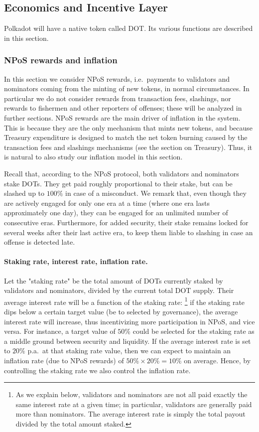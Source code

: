 \subsection{Economics and Incentive Layer}\label{sec:economics}

Polkadot will have a native token called DOT. Its various functions are described in this section.



\subsubsection{NPoS rewards and inflation}

In this section we consider NPoS rewards, i.e.~payments to validators and nominators coming from the minting of new tokens, 
in normal circumstances. In particular we do not consider rewards from transaction fees, slashings, nor rewards to fishermen 
and other reporters of offenses; these will be analyzed in further sections. 
NPoS rewards are the main driver of inflation in the system. 
This is because they are the only mechanism that mints new tokens, and because Treasury expenditure is designed to match 
the net token burning caused by the transaction fees and slashings mechanisms (see the section on Treasury). 
Thus, it is natural to also study our inflation model in this section.

Recall that, according to the NPoS protocol, both validators and nominators stake DOTs. 
They get paid roughly proportional to their stake, but can be slashed up to $100\%$ in case of a misconduct. 
We remark that, even though they are actively engaged for only one era at a time (where one era lasts approximately one day), 
they can be engaged for an unlimited number of consecutive eras. 
Furthermore, for added security, their stake remains locked for several weeks after their last active era, 
to keep them liable to slashing in case an offense is detected late.

\paragraph{Staking rate, interest rate, inflation rate.} Let the "staking rate" be the total amount of DOTs 
currently staked by validators and nominators, divided by the current total DOT supply. 
Their average interest rate will be a function of the staking rate:%
\footnote{As we explain below, validators and nominators are not all paid exactly the same 
interest rate at a given time; in particular, validators are generally paid more than nominators.  
The average interest rate is simply the total payout divided by the total amount staked.}
if the staking rate dips below a certain target value (be to selected by governance), 
the average interest rate will increase, thus incentivizing more participation in NPoS, and vice versa. 
For instance, a target value of $50\%$ could be selected for the staking rate as a middle ground between security 
and liquidity. If the average interest rate is set to $20\%$ p.a.~at that staking rate value, 
then we can expect to maintain an inflation rate (due to NPoS rewards) of $50\%\times 20\% = 10\%$ on average. 
Hence, by controlling the staking rate we also control the inflation rate. 


